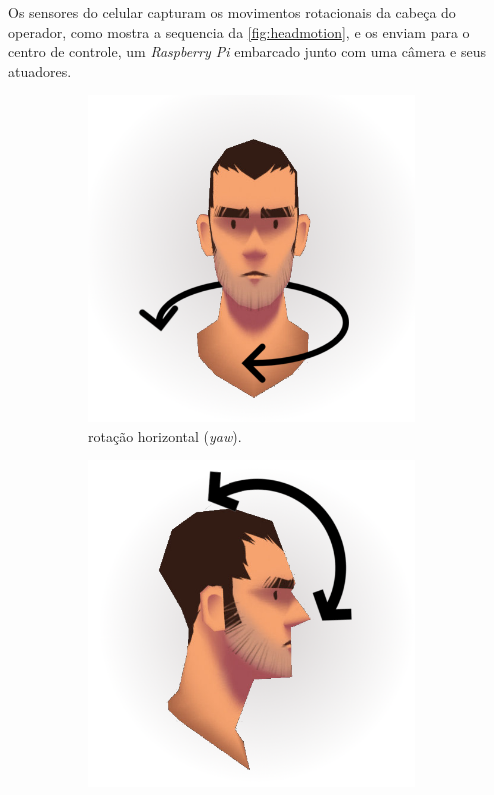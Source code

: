 Os sensores do celular capturam os movimentos rotacionais da cabeça do operador, como mostra a sequencia da \autoref{fig:headmotion}, e os enviam para o centro de controle, um \textit{Raspberry Pi} embarcado junto com uma câmera e seus atuadores.\par

\begin{figure}[H]
	\centering
	\begin{subfigure}{.5\textwidth}
		\includegraphics[width=0.95\textwidth]{figuras/yaw.png}
		\caption{rotação horizontal (\textit{yaw}).}
		\label{fig:headmotion_yaw}
	\end{subfigure}%
	\begin{subfigure}{.5\textwidth}
		\includegraphics[width=0.95\textwidth]{figuras/pitch.png}

\end{subfigure}
\end{figure}
